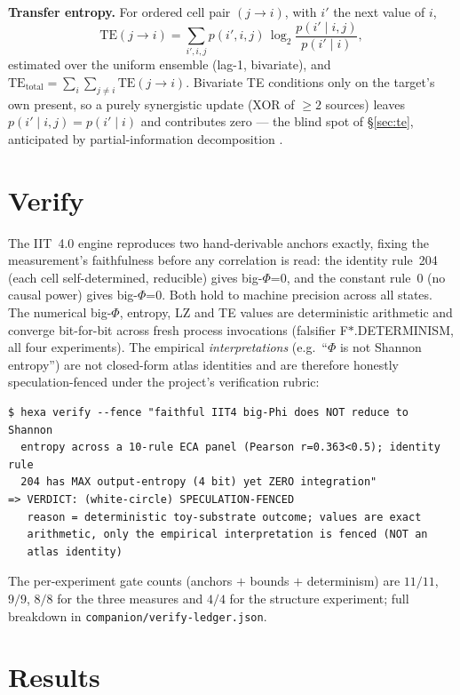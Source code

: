 \documentclass[11pt,a4paper]{article}
\newcommand{\bigphi}{\ensuremath{\Phi}}
\begin{document}
\textbf{Transfer entropy.} For ordered cell pair \((j\!\to\!i)\), with
\(i'\) the next value of \(i\),
\[
\mathrm{TE}(j\!\to\!i)=\sum_{i',i,j} p(i',i,j)\,
\log_2\frac{p(i'\mid i,j)}{p(i'\mid i)},
\]
estimated over the uniform ensemble (lag-1, bivariate), and
\(\mathrm{TE}_\mathrm{total}=\sum_{i}\sum_{j\neq i}\mathrm{TE}(j\!\to\!i)\).
Bivariate TE conditions only on the target's own present, so a purely
synergistic update (XOR of $\ge2$ sources) leaves
\(p(i'\mid i,j)=p(i'\mid i)\) and contributes zero --- the blind spot of
\S\ref{sec:te}, anticipated by partial-information decomposition
\citep{williamsbeer2010}.

\section{Verify}
\label{sec:verify}

The IIT~4.0 engine reproduces two hand-derivable anchors exactly, fixing
the measurement's faithfulness before any correlation is read: the
identity rule~204 (each cell self-determined, reducible) gives
big-\bigphi{}=0, and the constant rule~0 (no causal power) gives
big-\bigphi{}=0. Both hold to machine precision across all states. The
numerical big-\bigphi{}, entropy, LZ and TE values are deterministic
arithmetic and converge bit-for-bit across fresh process invocations
(falsifier F\(\ast\).DETERMINISM, all four experiments). The empirical
\emph{interpretations} (e.g.\ ``\bigphi{} is not Shannon entropy'') are
not closed-form atlas identities and are therefore honestly
speculation-fenced under the project's verification rubric:

\begin{lstlisting}[basicstyle=\ttfamily\footnotesize,frame=single,xleftmargin=0pt,breaklines=true]
$ hexa verify --fence "faithful IIT4 big-Phi does NOT reduce to Shannon
  entropy across a 10-rule ECA panel (Pearson r=0.363<0.5); identity rule
  204 has MAX output-entropy (4 bit) yet ZERO integration"
=> VERDICT: (white-circle) SPECULATION-FENCED
   reason = deterministic toy-substrate outcome; values are exact
   arithmetic, only the empirical interpretation is fenced (NOT an
   atlas identity)
\end{lstlisting}

\noindent The per-experiment gate counts (anchors $+$ bounds $+$
determinism) are \(11/11\), \(9/9\), \(8/8\) for the three measures and
\(4/4\) for the structure experiment; full breakdown in
\texttt{companion/verify-ledger.json}.

\section{Results}
\label{sec:results}
\end{document}
